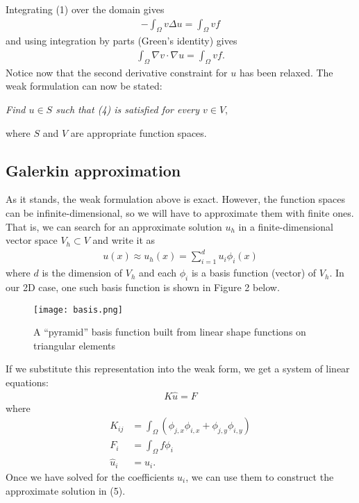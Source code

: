 \documentclass[12pt,notitlepage]{extreport}
\begin{document}
Integrating (1) over the domain gives
\begin{align}
  -\int_\Omega v \Delta u = \int_\Omega v f
\end{align}
and using integration by parts (Green's identity) gives
\begin{align}
  \int_\Omega \nabla v \cdot \nabla u = \int_\Omega v f.
\end{align}
Notice now that the second derivative constraint for $u$ has been relaxed. The weak formulation can now be stated:

\textit{Find $u \in S$ such that (4) is satisfied for every $v \in V$},

\noindent where $S$ and $V$ are appropriate function spaces.

\subsection*{Galerkin approximation}
As it stands, the weak formulation above is exact. However, the function spaces can be infinite-dimensional, so we will have to approximate them with finite ones. That is, we can search for an approximate solution $u_h$ in a finite-dimensional vector space $V_h \subset V$ and write it as
\begin{align}
  u(x) \approx u_h(x) = \sum_{i=1}^d u_i \phi_i(x)
\end{align}
where $d$ is the dimension of $V_h$ and each $\phi_i$ is a basis function (vector) of $V_h$. In our 2D case, one such basis function is shown in Figure 2 below.
\begin{figure}[h]
  \centering
  \texttt{[image: basis.png]}

  \caption{A ``pyramid'' basis function built from linear shape functions on triangular elements}
  \label{fig:basis}
\end{figure}
If we substitute this representation into the weak form, we get a system of linear equations:
\begin{align}
  K\hat{u} = F
\end{align}
where
\begin{align}
  K_{ij} &= \int_\Omega (\phi_{j,x} \phi_{i,x} + \phi_{j,y} \phi_{i,y}) \\
  F_i &= \int_\Omega f \phi_i \\
  \hat{u}_i &= u_i.
\end{align}
Once we have solved for the coefficients $u_i$, we can use them to construct the approximate solution in (5).
\end{document}
